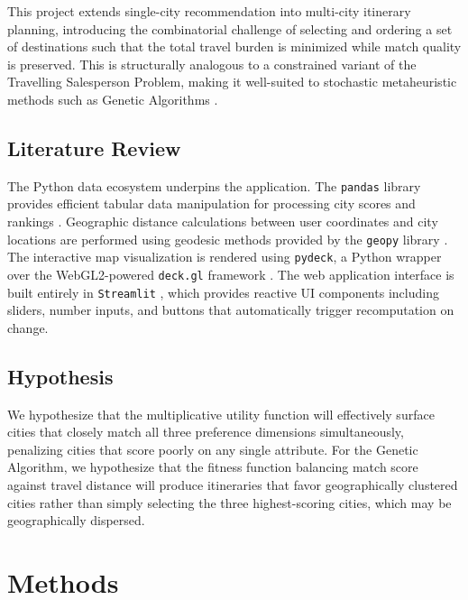 \documentclass[12pt]{article}
\begin{document}
This project extends single-city recommendation into multi-city itinerary planning, introducing the combinatorial challenge of selecting and ordering a set of destinations such that the total travel burden is minimized while match quality is preserved. This is structurally analogous to a constrained variant of the Travelling Salesperson Problem, making it well-suited to stochastic metaheuristic methods such as Genetic Algorithms \citep[ch.~1]{mitchell1996}.

\subsection{Literature Review}
The Python data ecosystem underpins the application. The \texttt{pandas} library provides efficient tabular data manipulation for processing city scores and rankings \citep{pandas2024}. Geographic distance calculations between user coordinates and city locations are performed using geodesic methods provided by the \texttt{geopy} library \citep{geopy2024}. The interactive map visualization is rendered using \texttt{pydeck}, a Python wrapper over the WebGL2-powered \texttt{deck.gl} framework \citep{deckgl2024}. The web application interface is built entirely in \texttt{Streamlit} \citep{streamlit2024}, which provides reactive UI components including sliders, number inputs, and buttons that automatically trigger recomputation on change.

\subsection{Hypothesis}
We hypothesize that the multiplicative utility function will effectively surface cities that closely match all three preference dimensions simultaneously, penalizing cities that score poorly on any single attribute. For the Genetic Algorithm, we hypothesize that the fitness function balancing match score against travel distance will produce itineraries that favor geographically clustered cities rather than simply selecting the three highest-scoring cities, which may be geographically dispersed.

\section{Methods}
\end{document}
